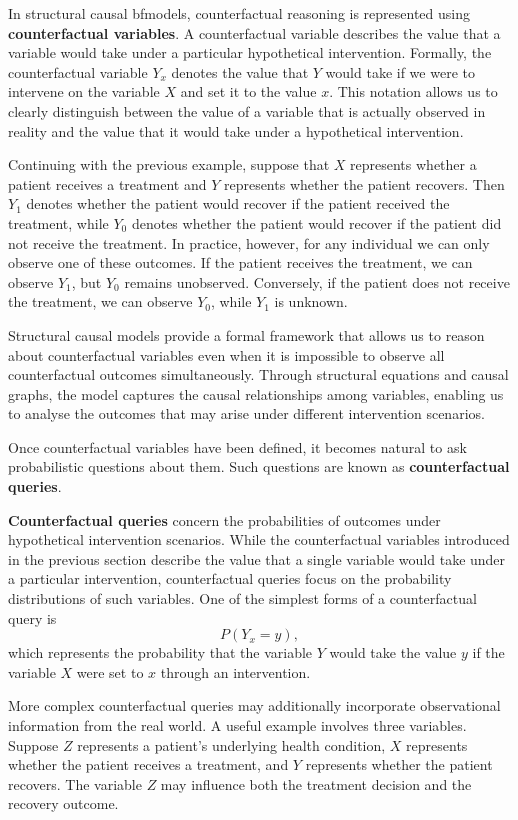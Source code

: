 \documentclass[a4paper]{report}
\begin{document}
In structural causal bfmodels, counterfactual reasoning is represented using \textbf{counterfactual variables}. A counterfactual variable describes the value that a variable would take under a particular hypothetical intervention. Formally, the counterfactual variable $Y_x$ denotes the value that $Y$ would take if we were to intervene on the variable $X$ and set it to the value $x$. 
This notation allows us to clearly distinguish between the value of a variable that is actually observed in reality and the value that it would take under a hypothetical intervention.

Continuing with the previous example, suppose that $X$ represents whether a patient receives a treatment and $Y$ represents whether the patient recovers. Then $Y_1$ denotes whether the patient would recover if the patient received the treatment, while $Y_0$ denotes whether the patient would recover if the patient did not receive the treatment. In practice, however, for any individual we can only observe one of these outcomes. 
If the patient receives the treatment, we can observe $Y_1$, but $Y_0$ remains unobserved. Conversely, if the patient does not receive the treatment, we can observe $Y_0$, while $Y_1$ is unknown.

Structural causal models provide a formal framework that allows us to reason about counterfactual variables even when it is impossible to observe all counterfactual outcomes simultaneously. Through structural equations and causal graphs, the model captures the causal relationships among variables, enabling us to analyse the outcomes that may arise under different intervention scenarios.

Once counterfactual variables have been defined, it becomes natural to ask probabilistic questions about them. Such questions are known as \textbf{counterfactual queries}.

\textbf{Counterfactual queries} concern the probabilities of outcomes under hypothetical intervention scenarios. While the counterfactual variables introduced in the previous section describe the value that a single variable would take under a particular intervention, counterfactual queries focus on the probability distributions of such variables. One of the simplest forms of a counterfactual query is
\[
P(Y_x = y),
\]
which represents the probability that the variable $Y$ would take the value $y$ if the variable $X$ were set to $x$ through an intervention. 

More complex counterfactual queries may additionally incorporate observational information from the real world. A useful example involves three variables. Suppose $Z$ represents a patient's underlying health condition, $X$ represents whether the patient receives a treatment, and $Y$ represents whether the patient recovers. The variable $Z$ may influence both the treatment decision and the recovery outcome.
\end{document}
